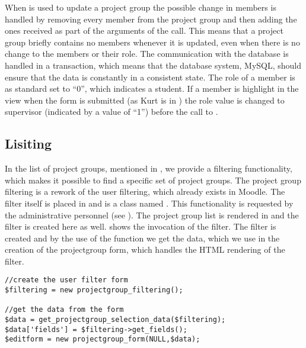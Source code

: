 When  is used to update a project group the possible change in members is handled by removing every member from the project group and then adding the ones received as part of the arguments of the call.
This means that a project group briefly contains no members whenever it is updated, even when there is no change to the members or their role.
The communication with the database is handled in a transaction, which means that the database system, MySQL, should ensure that the data is constantly in a consistent state.
The role of a member is as standard set to ``0'', which indicates a student. 
If a member is highlight in the view when the form is submitted (as Kurt is in ) the role value is changed to supervisor (indicated by a value of ``1'') before the call to .


\subsection{Lisiting}
In the list of project groups, mentioned in , we provide a filtering functionality, which makes it possible to find a specific set of project groups.
The project group filtering is a rework of the user filtering, which already exists in Moodle.
The filter itself is placed in  and is a class named .
This functionality is requested by the administrative personnel (see ).
The project group list is rendered in  and the filter is created here as well. 
 shows the invocation of the filter. 
The filter is created and by the use of the function  we get the data, which we use in the creation of the projectgroup form, which handles the HTML rendering of the filter. 
\begin{lstlisting}[style=phpCode, caption=\myCaption{The invocation of the filtering mechanism}, label=moodlefiltering]
//create the user filter form
$filtering = new projectgroup_filtering();

//get the data from the form
$data = get_projectgroup_selection_data($filtering);
$data['fields'] = $filtering->get_fields();
$editform = new projectgroup_form(NULL,$data);
\end{lstlisting}\begin{comment}$\end{comment}


